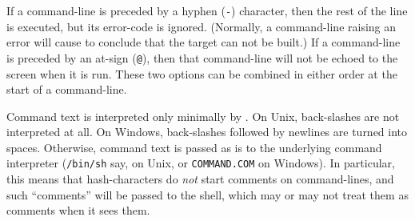 If a command-line is preceded by a hyphen (\verb!-!) character, then
the rest of the line is executed, but its error-code is ignored.
(Normally, a command-line raising an error will cause \holmake{} to
conclude that the target can not be built.)  If a command-line is
preceded by an at-sign (\verb!@!), then that command-line will not be
echoed to the screen when it is run.  These two options can be
combined in either order at the start of a command-line.

Command text is interpreted only minimally by \holmake.  On Unix,
back-slashes are not interpreted at all.  On Windows, back-slashes
followed by newlines are turned into spaces. Otherwise, command text
is passed as is to the underlying command interpreter
(\texttt{/bin/sh} say, on Unix, or \texttt{COMMAND.COM} on Windows).
In particular, this means that hash-characters do \emph{not} start
comments on command-lines, and such ``comments'' will be passed to the
shell, which may or may not treat them as comments when it sees them.

